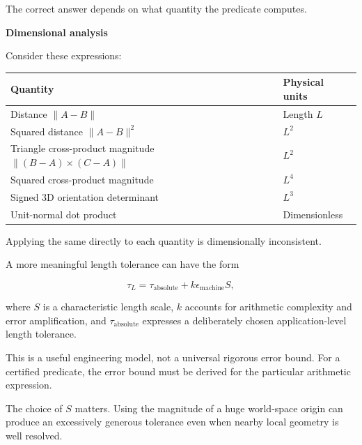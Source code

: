 The correct answer depends on what quantity the predicate computes.

\textbf{Dimensional analysis}

Consider these expressions:

{\def\LTcaptype{none} %
\begin{longtable}[]{@{}
  >{\raggedright\arraybackslash}p{}
  >{\raggedright\arraybackslash}p{}@{}}
\toprule\noalign{}
\begin{minipage}[b]{\linewidth}\raggedright
Quantity
\end{minipage} & \begin{minipage}[b]{\linewidth}\raggedright
Physical units
\end{minipage} \\
\midrule\noalign{}
\endhead
\bottomrule\noalign{}
\endlastfoot
Distance \(\|A-B\|\) & Length \(L\) \\
Squared distance \(\|A-B\|^2\) & \(L^2\) \\
Triangle cross-product magnitude \(\|(B-A)\times(C-A)\|\) & \(L^2\) \\
Squared cross-product magnitude & \(L^4\) \\
Signed 3D orientation determinant & \(L^3\) \\
Unit-normal dot product & Dimensionless \\
\end{longtable}
}

Applying the same  directly to each quantity is dimensionally inconsistent.

A more meaningful length tolerance can have the form

\[
\tau_L=\tau_{\text{absolute}}+ k\epsilon_{\text{machine}}S,
\]

where \(S\) is a characteristic length scale, \(k\) accounts for arithmetic complexity and error amplification, and \(\tau_{\text{absolute}}\) expresses a deliberately chosen application-level length tolerance.

This is a useful engineering model, not a universal rigorous error bound. For a certified predicate, the error bound must be derived for the particular arithmetic expression.

The choice of \(S\) matters. Using the magnitude of a huge world-space origin can produce an excessively generous tolerance even when nearby local geometry is well resolved.

